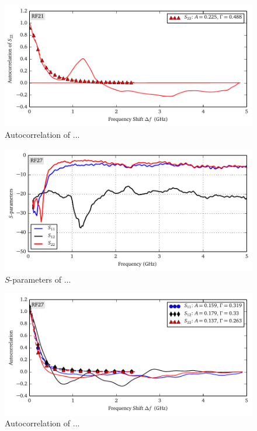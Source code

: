 \begin{figure}
 \centering
 \includegraphics{figs/active/RF21-autoCorrelation.pdf}
 \caption{Autocorrelation of ...}
\end{figure}

\begin{figure}
 \centering
 \includegraphics{figs/active/RF27-sParameters.pdf}
 \caption{$S$-parameters of ...}
\end{figure}

\begin{figure}
 \centering
 \includegraphics{figs/active/RF27-autoCorrelation.pdf}
 \caption{Autocorrelation of ...}
\end{figure}

